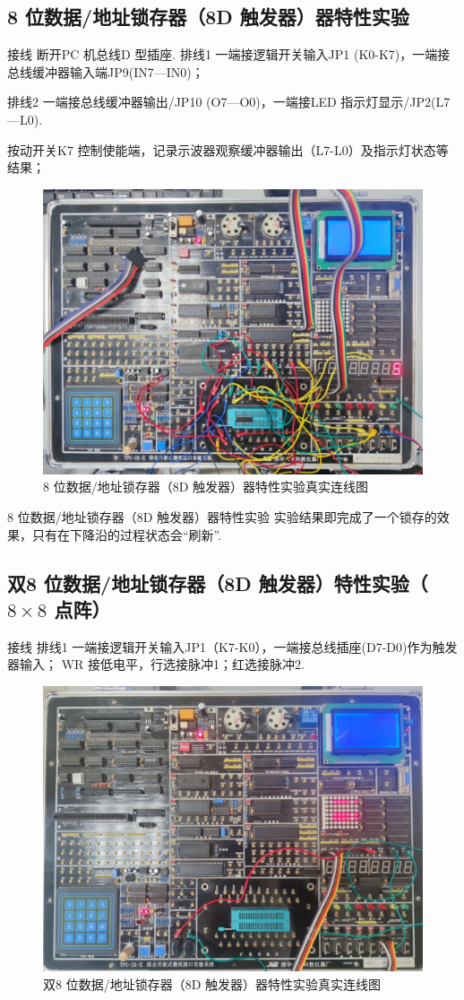 \documentclass[11pt]{SEU-Digital-Report}
\begin{document}
      \subsection{8 位数据/地址锁存器（8D 触发器）器特性实验}

      \begin{note}{接线}{}
        断开PC 机总线D 型插座.
        排线1 一端接逻辑开关输入JP1 (K0-K7)，一端接总线缓冲器输入端JP9(IN7---IN0)；

      排线2 一端接总线缓冲器输出/JP10 (O7---O0)，一端接LED 指示灯显示/JP2(L7---L0).
      \end{note}

      按动开关K7 控制使能端，记录示波器观察缓冲器输出（L7-L0）及指示灯状态等结果；

      \begin{figure}[htbp]
        \centering
        \includegraphics[width=.45\linewidth]{fig/74LS237_real.jpg}
        \caption{8 位数据/地址锁存器（8D 触发器）器特性实验真实连线图}
      \end{figure}

      \begin{analyze}{8 位数据/地址锁存器（8D 触发器）器特性实验}{}
        实验结果即完成了一个锁存的效果，只有在下降沿的过程状态会“刷新”.
      \end{analyze}


    \subsection{双8 位数据/地址锁存器（8D 触发器）特性实验（$8\times 8$ 点阵）}
    \begin{note}{接线}{}
      排线1 一端接逻辑开关输入JP1（K7-K0），一端接总线插座(D7-D0)作为触发器输入；
WR 接低电平，行选接脉冲1；红选接脉冲2.
    \end{note}
    
    \begin{figure}[htbp]
      \centering
      \includegraphics[width=.45\linewidth]{fig/8x8_real.jpg}
      \caption{双8 位数据/地址锁存器（8D 触发器）器特性实验真实连线图}
    \end{figure}
\end{document}
